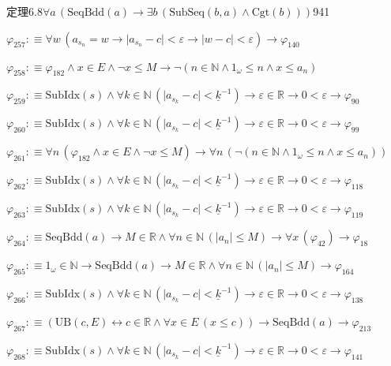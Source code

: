\begin{fullproof}{定理6.8}{$\forall a\,(\mathrm{SeqBdd}(a) \to \exists b\,(\mathrm{SubSeq}(b,a) \land \mathrm{Cgt}(b)))$}{941}
\begin{abbrevlist}
\item $\varphi_{257} :\equiv \forall w\,(a_{s_{n}} = w \to \lvert a_{s_{n}} - c \rvert < \varepsilon \to \lvert w - c \rvert < \varepsilon) \to \varphi_{140}$
\item $\varphi_{258} :\equiv \varphi_{182} \land x \in E \land \neg x \leq M \to \neg (n \in \mathbb{N} \land 1_{\omega} \leq n \land x \leq a_{n})$
\item $\varphi_{259} :\equiv \mathrm{SubIdx}(s) \land \forall k \in \mathbb{N}\,(\lvert a_{s_{k}} - c \rvert < \underline{k}^{-1}) \to \varepsilon \in \mathbb{R} \to 0 < \varepsilon \to \varphi_{90}$
\item $\varphi_{260} :\equiv \mathrm{SubIdx}(s) \land \forall k \in \mathbb{N}\,(\lvert a_{s_{k}} - c \rvert < \underline{k}^{-1}) \to \varepsilon \in \mathbb{R} \to 0 < \varepsilon \to \varphi_{99}$
\item $\varphi_{261} :\equiv \forall n\,(\varphi_{182} \land x \in E \land \neg x \leq M) \to \forall n\,(\neg (n \in \mathbb{N} \land 1_{\omega} \leq n \land x \leq a_{n}))$
\item $\varphi_{262} :\equiv \mathrm{SubIdx}(s) \land \forall k \in \mathbb{N}\,(\lvert a_{s_{k}} - c \rvert < \underline{k}^{-1}) \to \varepsilon \in \mathbb{R} \to 0 < \varepsilon \to \varphi_{118}$
\item $\varphi_{263} :\equiv \mathrm{SubIdx}(s) \land \forall k \in \mathbb{N}\,(\lvert a_{s_{k}} - c \rvert < \underline{k}^{-1}) \to \varepsilon \in \mathbb{R} \to 0 < \varepsilon \to \varphi_{119}$
\item $\varphi_{264} :\equiv \mathrm{SeqBdd}(a) \to M \in \mathbb{R} \land \forall n \in \mathbb{N}\,(\lvert a_{n} \rvert \leq M) \to \forall x\,(\varphi_{42}) \to \varphi_{18}$
\item $\varphi_{265} :\equiv 1_{\omega} \in \mathbb{N} \to \mathrm{SeqBdd}(a) \to M \in \mathbb{R} \land \forall n \in \mathbb{N}\,(\lvert a_{n} \rvert \leq M) \to \varphi_{164}$
\item $\varphi_{266} :\equiv \mathrm{SubIdx}(s) \land \forall k \in \mathbb{N}\,(\lvert a_{s_{k}} - c \rvert < \underline{k}^{-1}) \to \varepsilon \in \mathbb{R} \to 0 < \varepsilon \to \varphi_{138}$
\item $\varphi_{267} :\equiv (\mathrm{UB}(c,E) \leftrightarrow c \in \mathbb{R} \land \forall x \in E\,(x \leq c)) \to \mathrm{SeqBdd}(a) \to \varphi_{213}$
\item $\varphi_{268} :\equiv \mathrm{SubIdx}(s) \land \forall k \in \mathbb{N}\,(\lvert a_{s_{k}} - c \rvert < \underline{k}^{-1}) \to \varepsilon \in \mathbb{R} \to 0 < \varepsilon \to \varphi_{141}$

\end{abbrevlist}
\end{fullproof}
